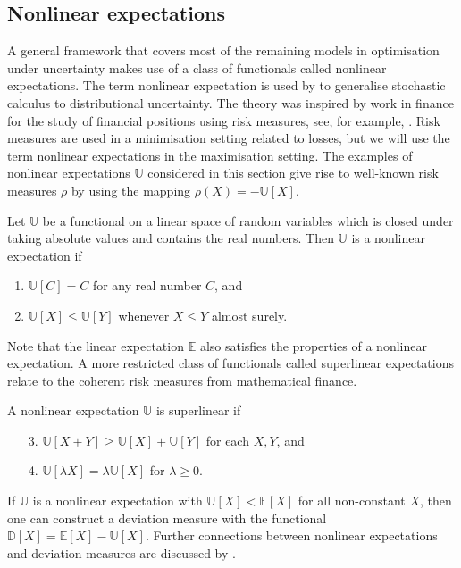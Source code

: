 \documentclass[main.tex]{subfiles}
\begin{document}
\subsection{Nonlinear expectations}\label{sec:nonlinear_expectations}
A general framework that covers most of the remaining models
in optimisation under uncertainty makes use of a class of functionals
called nonlinear expectations. The term nonlinear expectation is used
by \citet{peng2010nonlinear} to generalise stochastic calculus to
distributional uncertainty.
The theory was inspired by work in finance for the study of financial
positions using
risk measures, see,
for example, \citet[Ch.~4]{follmer2004stochastic}.
Risk measures are used in a minimisation setting related to losses,
but we will use the term nonlinear expectations in the maximisation
setting. The examples of nonlinear expectations $\mathbb{U}$ considered
in this section give rise to well-known risk measures $\rho$ by using the mapping
$\rho(X) = -\mathbb{U}[X]$.

\begin{mydef}
  Let $\mathbb{U}$ be a functional on a linear space of random
  variables which is closed under taking absolute values and contains
  the real numbers.
  Then $\mathbb{U}$ is a nonlinear expectation if
  \begin{enumerate}
  \item $\mathbb{U}[C] = C$ for any real number $C$, and
  \item $\mathbb{U}[X]\leq \mathbb{U}[Y]$ whenever $X\leq Y$ almost surely.
  \end{enumerate}
\end{mydef}
Note that the linear expectation $\mathbb{E}$ also satisfies
the properties of a nonlinear expectation.
A more restricted class of functionals called superlinear expectations
relate to the coherent risk measures from mathematical finance.
\begin{mydef}
  A nonlinear expectation $\mathbb{U}$ is superlinear if
  \begin{enumerate}
  \item[3.] $\mathbb{U}[X+Y]\geq \mathbb{U}[X] +\mathbb{U}[Y]$ for
    each $X,Y$, and
  \item[4.] $\mathbb{U}[\lambda X] = \lambda\mathbb{U}[X]$ for
    $\lambda\geq 0$.
  \end{enumerate}
\end{mydef}

If $\mathbb{U}$ is a nonlinear expectation
with $\mathbb{U}[X] < \mathbb{E}[X]$ for all non-constant $X$,
then one can
construct a deviation measure with the functional
$\mathbb{D}[X]=\mathbb{E}[X]-\mathbb{U}[X]$.
Further connections between nonlinear expectations and deviation
measures are discussed by \citet{rockafellar2013fundamental}.
\end{document}
